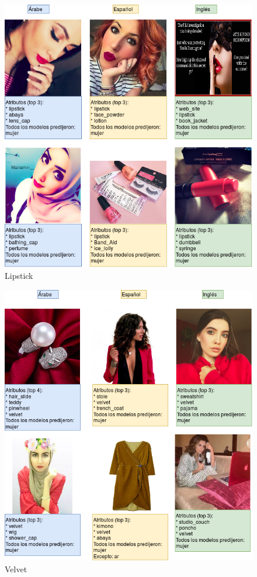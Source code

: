 \documentclass[runningheads]{llncs}
\begin{document}
\begin{figure}
    \centering
    \includegraphics[scale=0.37]{img/best_gi/lipstick_gi.png}
    \caption{Lipstick}
    \label{fig:lipstick}
\end{figure}
\begin{figure}
    \centering
    \includegraphics[scale=0.37]{img/best_gi/velvet_gi.png}
    \caption{Velvet}
    \label{fig:velvet}
\end{figure}
\end{document}
